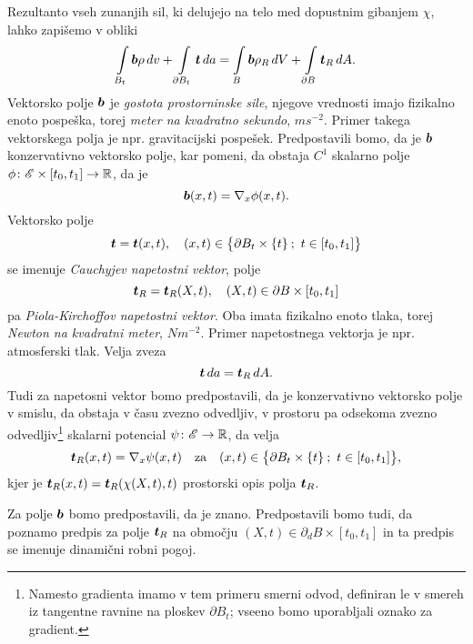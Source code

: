Rezultanto vseh zunanjih sil, ki delujejo na telo med dopustnim gibanjem $\chi$, lahko zapišemo v obliki
\begin{equation}\label{e:zunsil}
	\int\limits_{B_t}\boldsymbol b\rho\, dv + \int\limits_{\partial B_t}\boldsymbol t\, da =
	\int\limits_{B}\boldsymbol b\rho_R\, dV + \int\limits_{\partial B}\boldsymbol t_R\, dA.
\end{equation}
Vektorsko polje $\boldsymbol b$ je \emph{gostota prostorninske sile}, njegove vrednosti imajo fizikalno enoto
pospeška, torej \textit{meter na kvadratno sekundo}, $ms^{-2}$. Primer takega vektorskega polja
je npr. gravitacijski pospešek. Predpostavili bomo, da je $\boldsymbol b$ konzervativno vektorsko polje,
kar pomeni, da obstaja $C^1$ skalarno polje $\phi\colon\mathscr E\times [t_0,t_1]\to\mathbb R$, da je
\begin{equation*} \label{e:gps}
	\boldsymbol b(x,t)=\nabla_{x}\phi(x,t).
\end{equation*}
Vektorsko polje
\begin{equation*} \label{e:csv}
	\boldsymbol t=\boldsymbol t(x,t),\quad (x,t)\in \big\{\partial B_t\times\{t\}\: ;\ t\in [t_0,t_1]\big\}
\end{equation*}
se imenuje \emph{Cauchyjev napetostni vektor}, polje
\begin{equation*} \label{e:pksv}
	\boldsymbol t_R=\boldsymbol t_R(X,t),\quad (X,t)\in \partial B\times [t_0,t_1]
\end{equation*}
pa \emph{Piola-Kirchoffov napetostni vektor}. Oba
imata fizikalno enoto tlaka, torej \textit{Newton na kvadratni meter}, $Nm^{-2}$.
Primer napetostnega vektorja je npr. atmosferski tlak.
Velja zveza
\begin{equation}\label{e:ttr}
	\boldsymbol t\, da=\boldsymbol t_R\, dA.
\end{equation}
Tudi za napetosni vektor bomo predpostavili, da je konzervativno vektorsko polje v smislu,
da obstaja v času zvezno odvedljiv, v prostoru pa odsekoma zvezno odvedljiv\footnote{Namesto gradienta imamo v tem primeru
smerni odvod, definiran le v smereh iz tangentne ravnine na ploskev $\partial B_t$; vseeno bomo uporabljali oznako za gradient.}
skalarni potencial $\psi\colon\mathscr E\to\mathbb R$, da velja
\[ \boldsymbol t_R(x,t)=\nabla_{x}\psi(x,t)\quad\textrm{za}\quad (x,t)\in \big\{\partial B_t\times\{t\}\: ;\ t\in [t_0,t_1]\big\}, \]
kjer je $\boldsymbol t_R(x,t)=\boldsymbol t_R(\chi(X,t),t)$ prostorski opis polja $\boldsymbol t_R$.

Za polje $\boldsymbol b$ bomo predpostavili, da je znano. Predpostavili bomo tudi, da poznamo predpis za
polje $\boldsymbol t_R$ na območju $(X,t)\in \partial_d B\times [t_0,t_1]$ in ta predpis
se imenuje dinamični robni pogoj.

